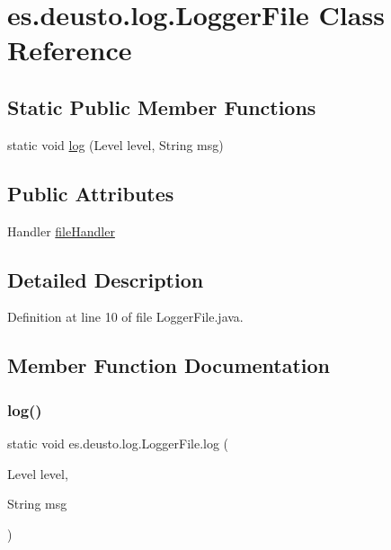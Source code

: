 \hypertarget{classes_1_1deusto_1_1log_1_1_logger_file}{}\section{es.\+deusto.\+log.\+Logger\+File Class Reference}
\label{classes_1_1deusto_1_1log_1_1_logger_file}
\subsection*{Static Public Member Functions}
\begin{DoxyCompactItemize}
\item 
static void \hyperlink{classes_1_1deusto_1_1log_1_1_logger_file_a4e06bbb39aba89d877644269e24f679f}{log} (Level level, String msg)
\end{DoxyCompactItemize}
\subsection*{Public Attributes}
\begin{DoxyCompactItemize}
\item 
Handler \hyperlink{classes_1_1deusto_1_1log_1_1_logger_file_a9140523c75d641a5716eb51f175e9efa}{file\+Handler}
\end{DoxyCompactItemize}


\subsection{Detailed Description}


Definition at line 10 of file Logger\+File.\+java.



\subsection{Member Function Documentation}
\mbox{\label{classes_1_1deusto_1_1log_1_1_logger_file_a4e06bbb39aba89d877644269e24f679f}} 
\subsubsection{\texorpdfstring{log()}{log()}}
{\footnotesize\ttfamily static void es.\+deusto.\+log.\+Logger\+File.\+log (\begin{DoxyParamCaption}\item[{Level}]{level,  }\item[{String}]{msg }\end{DoxyParamCaption})\hspace{0.3cm}{\ttfamily [static]}}



